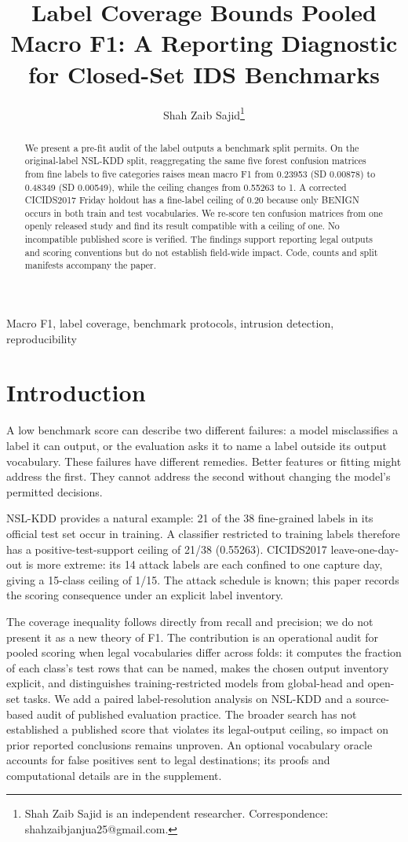 \documentclass[journal]{IEEEtran}
\title{Label Coverage Bounds Pooled Macro F1: A Reporting Diagnostic for Closed-Set IDS Benchmarks}
\author{Shah Zaib Sajid\thanks{Shah Zaib Sajid is an independent researcher. Correspondence: shahzaibjanjua25@gmail.com.}}
\begin{document}
\maketitle
\begin{abstract}
We present a pre-fit audit of the label outputs a benchmark split permits. On the original-label NSL-KDD split, reaggregating the same five forest confusion matrices from fine labels to five categories raises mean macro F1 from 0.23953 (SD 0.00878) to 0.48349 (SD 0.00549), while the ceiling changes from 0.55263 to 1. A corrected CICIDS2017 Friday holdout has a fine-label ceiling of 0.20 because only BENIGN occurs in both train and test vocabularies. We re-score ten confusion matrices from one openly released study and find its result compatible with a ceiling of one. No incompatible published score is verified. The findings support reporting legal outputs and scoring conventions but do not establish field-wide impact. Code, counts and split manifests accompany the paper.
\end{abstract}
\begin{IEEEkeywords}
Macro F1, label coverage, benchmark protocols, intrusion detection, reproducibility
\end{IEEEkeywords}
\section{Introduction}
A low benchmark score can describe two different failures: a model misclassifies a label it can output, or the evaluation asks it to name a label outside its output vocabulary. These failures have different remedies. Better features or fitting might address the first. They cannot address the second without changing the model's permitted decisions.

NSL-KDD provides a natural example: 21 of the 38 fine-grained labels in its official test set occur in training. A classifier restricted to training labels therefore has a positive-test-support ceiling of 21/38 (0.55263). CICIDS2017 leave-one-day-out is more extreme: its 14 attack labels are each confined to one capture day, giving a 15-class ceiling of 1/15. The attack schedule is known; this paper records the scoring consequence under an explicit label inventory.

The coverage inequality follows directly from recall and precision; we do not present it as a new theory of F1. The contribution is an operational audit for pooled scoring when legal vocabularies differ across folds: it computes the fraction of each class's test rows that can be named, makes the chosen output inventory explicit, and distinguishes training-restricted models from global-head and open-set tasks. We add a paired label-resolution analysis on NSL-KDD and a source-based audit of published evaluation practice. The broader search has not established a published score that violates its legal-output ceiling, so impact on prior reported conclusions remains unproven. An optional vocabulary oracle accounts for false positives sent to legal destinations; its proofs and computational details are in the supplement.
\end{document}
